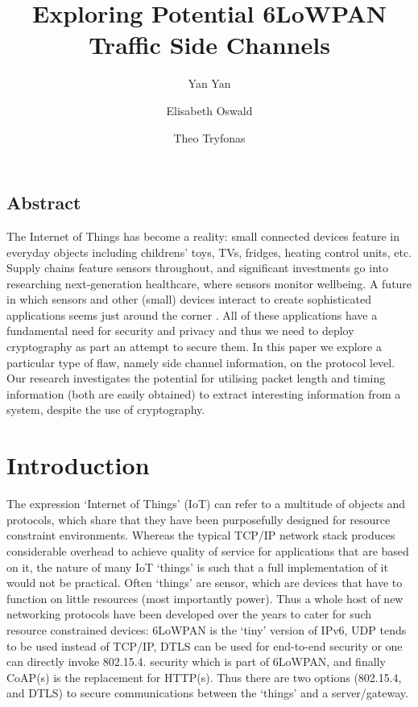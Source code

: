 \documentclass{article}
\title{Exploring Potential 6LoWPAN Traffic Side Channels}
\author{Yan Yan \and Elisabeth Oswald \and Theo Tryfonas}
\begin{document}
\maketitle


\subsection*{Abstract}
The Internet of Things has become a reality: small connected devices feature in everyday objects
including childrens' toys, TVs, fridges, heating control units, etc. Supply chains feature sensors
throughout, and significant investments go into researching next-generation healthcare, 
where sensors monitor wellbeing. A future in which sensors and other (small) devices interact to create sophisticated applications seems just around the corner . All of these applications have a fundamental need for security and privacy and thus we need to deploy cryptography as part an attempt to secure them. In this paper we explore a particular type of flaw, namely side channel information, on the protocol level. Our research investigates the potential for utilising packet length and timing information (both are easily obtained) to extract interesting information from a system, despite the use of cryptography. 


\section{Introduction}
The expression `Internet of Things' (IoT) can refer to a multitude of objects and protocols, which share that they have been purposefully designed for resource constraint environments. Whereas the typical TCP/IP network stack produces considerable overhead to achieve quality of service for applications that are based on it, the nature of many IoT `things' is such that a full implementation of it would not be practical. Often `things' are sensor, which are devices that have to function on little resources (most importantly power). Thus a whole host of new networking protocols have been developed over the years to cater for such resource constrained devices: 6LoWPAN is the `tiny' version of IPv6, UDP tends to be used instead of TCP/IP, DTLS can be used for end-to-end security or one can directly invoke 802.15.4. security which is part of 6LoWPAN, and finally CoAP(s) is the replacement for HTTP(s). Thus there are two options (802.15.4, and DTLS) to secure communications between the `things' and a server/gateway. 
\end{document}
